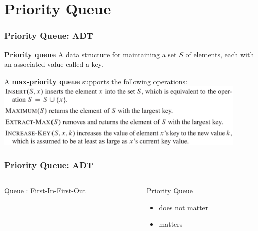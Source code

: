 \documentclass[UTF8,11pt]{beamer}
\begin{document}
\section{Priority Queue}
\begin{frame}[t]
\frametitle{Priority Queue: ADT}
\begin{center}
	\begin{block}{\textbf{Priority queue}}
		A  data structure for maintaining a set $S$ of elements, each with an associated value called a {\color{red}key}.
	\end{block}
	\pause
	\begin{block}{A \textbf{max-priority queue} supports the following operations:}
		\includegraphics[width=0.9\textwidth]{figs/priority_queue_operations.png}
	\end{block}
\end{center}
\end{frame}

\begin{frame}[t]
\frametitle{Priority Queue: ADT}
\begin{center}
\end{center}
\begin{columns}
	\begin{column}[T, onlytextwidth]{.45\textwidth}
		\begin{block}{Queue}
			\textbf{}: First-In-First-Out
		\end{block}
		
	\end{column}
	\begin{column}[T, onlytextwidth]{.45\textwidth}
		\begin{block}{Priority Queue}
			\begin{itemize}
				\item {} does not matter
				\item {} matters
			\end{itemize}
		\end{block}
	\end{column}
\end{columns}
\end{frame}
\end{document}
